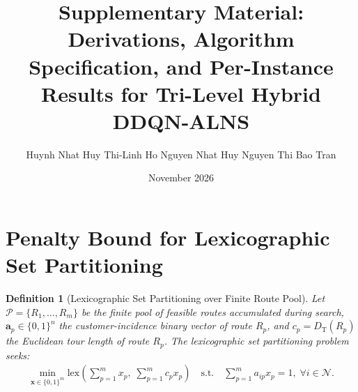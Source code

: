 \documentclass{article}
\title{\textbf{Supplementary Material: Derivations, Algorithm Specification, and Per-Instance Results for Tri-Level Hybrid DDQN-ALNS}}
\author{Huynh Nhat Huy \quad Thi-Linh Ho \quad Nguyen Nhat Huy \quad Nguyen Thi Bao Tran}
\date{November 2026}
\newcommand{\TD}{{D_\mathrm{T}}}
\newtheorem{definition}{Definition}
\begin{document}
\maketitle

\section{Penalty Bound for Lexicographic Set Partitioning}

\begin{definition}[Lexicographic Set Partitioning over Finite Route Pool]
Let $\mathcal{P} = \{R_1, \dots, R_m\}$ be the finite pool of feasible routes accumulated during search, $\mathbf{a}_p \in \{0, 1\}^n$ the customer-incidence binary vector of route $R_p$, and $c_p = \TD(R_p)$ the Euclidean tour length of route $R_p$. The lexicographic set partitioning problem seeks:
\begin{align}
\min_{\mathbf{x} \in \{0, 1\}^m} \text{lex} \left( \sum_{p=1}^m x_p, \; \sum_{p=1}^m c_p x_p \right) \quad \text{s.t.} \quad \sum_{p=1}^m a_{ip} x_p = 1, \; \forall i \in \mathcal{N}.
\end{align}
\end{definition}
\end{document}
